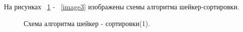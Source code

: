 \documentclass[a4paper]{article}
\begin{document}
	На рисунках ~\ref{image2} - ~\ref{image3} изображены схемы алгоритма шейкер-сортировки.
	\begin{figure}[h]
		\caption{Схема алгоритма шейкер - сортировки(1). \centering}
		\label{image2}
	\end{figure}
\end{document}
